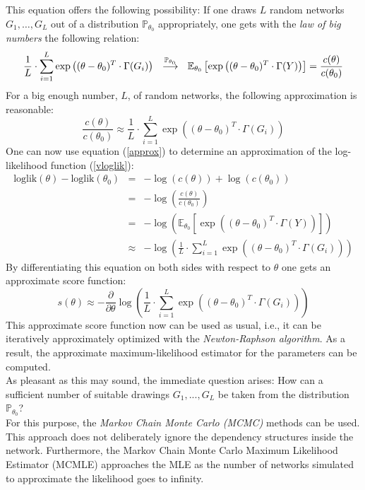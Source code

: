 \documentclass[headsepline=true, abstracton]{scrartcl}
\begin{document}
%
This equation offers the following possibility: If one draws $L$ random networks $G_1, \dots ,G_L$ out of a distribution $\mathbb{P}_{\theta_0}$ appropriately, one gets with the \textit{law of big numbers} the following relation:
%
\begin{equation}
\frac{1}{L}\cdot \sum_{i=1}^{L}  \exp\left((\theta - \theta_0)^T \cdot \Gamma(G_i)\right)
~~\stackrel {{\tiny\mathbb{P}_{\theta_0}}}{\longrightarrow}~~ \mathbb{E}_{\theta_0}\left[ \exp\left((\theta - \theta_0)^T \cdot \Gamma(Y)\right) \right] = \frac{c(\theta)}{c(\theta_0)}
\label{konver}
\end{equation}
%
For a big enough number, $L$, of random networks, the following approximation is reasonable:
%
\begin{equation}
\frac{c(\theta)}{c(\theta_0)} \approx \frac{1}{L}\cdot \sum_{i=1}^{L}  \exp\left((\theta - \theta_0)^T \cdot \Gamma(G_i)\right)
\label{approx}
\end{equation}
%
One can now use equation (\ref{approx}) to determine an approximation of the log-likelihood function (\ref{vloglik}):
%
\begin{eqnarray*}
\text{loglik}(\theta)-\text{loglik}(\theta_0)&=&- \log(c(\theta))+\log(c(\theta_0))\\
                                             &=&- \log \left( \frac{c(\theta)}{c(\theta_0)} \right)\\
                                             &=&- \log \left( \mathbb{E}_{\theta_0}\left[ \exp\left((\theta - \theta_0)^T \cdot \Gamma(Y)\right) \right] \right)\\
                                             &\approx &- \log \left( \frac{1}{L} \cdot \sum_{i=1}^{L}  \exp \left((\theta - \theta_0)^T \cdot \Gamma(G_i) \right) \right)
\end{eqnarray*}
%
By differentiating this equation on both sides with respect to $\theta$ one gets an approximate score function:
%
\begin{equation}
s(\theta) \approx -\frac{\partial}{\partial \theta} \log \left( \frac{1}{L} \cdot \sum_{i=1}^{L}  \exp \left((\theta - \theta_0)^T \cdot \Gamma(G_i) \right) \right)
\label{score}
\end{equation}
%
This approximate score function now can be used as usual, i.e., it can be iteratively approximately optimized with the \textit{Newton-Raphson algorithm}. As a result, the approximate maximum-likelihood estimator for the parameters can be computed.\\[0.4cm]
As pleasant as this may sound, the immediate question arises: How can a sufficient number of suitable drawings $G_1,...,G_L$ be taken from the distribution $\mathbb{P}_{\theta_0}$? \\
For this purpose, the \textit{Markov Chain Monte Carlo (MCMC)} methods can be used. This approach does not deliberately ignore the dependency structures inside the network. Furthermore, the Markov Chain Monte Carlo Maximum Likelihood Estimator (MCMLE) approaches the MLE as the number of networks simulated to approximate the likelihood goes to infinity.\\[0.3cm]
\end{document}

